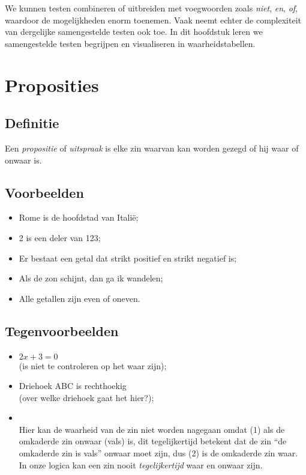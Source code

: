 We kunnen testen combineren of uitbreiden met voegwoorden zoals \emph{niet}, \emph{en}, \emph{of}, waardoor de mogelijkheden enorm toenemen. Vaak neemt echter de complexiteit van dergelijke samengestelde testen ook toe. In dit hoofdstuk leren we samengestelde testen begrijpen en visualiseren in waarheidstabellen.

 \section{Proposities}
 \subsection{Definitie}
Een \emph{propositie} of \emph{uitspraak} is elke zin waarvan kan worden gezegd of hij waar of onwaar is.

\subsection{Voorbeelden}
\begin{itemize}
  \item Rome is de hoofdstad van Itali\"{e};
  \item 2 is een deler van 123;
  \item Er bestaat een getal dat strikt positief en strikt negatief is;
  \item Als de zon schijnt, dan ga ik wandelen;
  \item Alle getallen zijn even of oneven.
\end{itemize}

\subsection{Tegenvoorbeelden}
\begin{itemize}
  \item $2x + 3 = 0$ \\(is niet te controleren op het waar zijn);
  \item Driehoek ABC is rechthoekig \\(over welke driehoek gaat het hier?);
  \item {}  \\Hier kan de waarheid van de zin niet worden nagegaan omdat (1) als de omkaderde zin onwaar (vals) is, dit tegelijkertijd betekent dat de zin ``de omkaderde zin is vals'' onwaar moet zijn, dus (2) is de omkaderde zin waar. In onze logica kan een zin nooit \emph{tegelijkertijd} waar en onwaar zijn.
\end{itemize}

